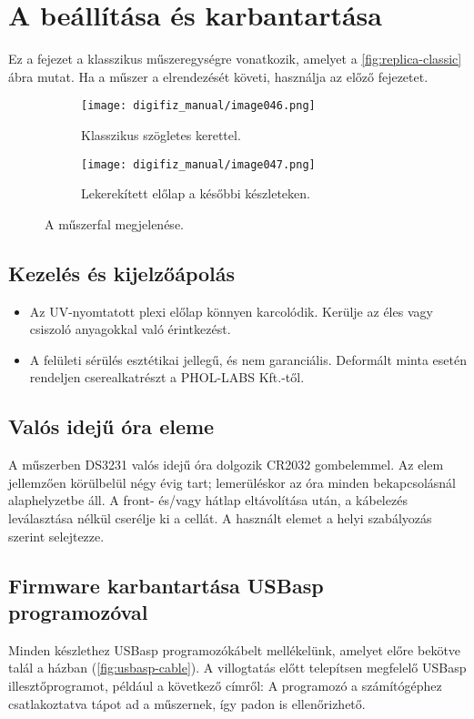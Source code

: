 \chapter{A \ReplicaGenOne{} beállítása és karbantartása}\label{ch:replica-setup}

Ez a fejezet a klasszikus \ReplicaGenOne{} műszeregységre vonatkozik, amelyet a \autoref{fig:replica-classic} ábra mutat. Ha a műszer a \ReplicaNextLong{} elrendezését követi, használja az előző fejezetet.

\begin{figure}[htbp]
    \centering
    \begin{subfigure}{0.46\textwidth}
        \texttt{[image: digifiz\_manual/image046.png]}
        \caption{Klasszikus \ReplicaGenOne{} szögletes kerettel.}
    \end{subfigure}\hfill
    \begin{subfigure}{0.46\textwidth}
        \texttt{[image: digifiz\_manual/image047.png]}
        \caption{Lekerekített előlap a későbbi készleteken.}
    \end{subfigure}
    \caption{A \ReplicaGenOne{} műszerfal megjelenése.}
    \label{fig:replica-classic}
\end{figure}

\section{Kezelés és kijelzőápolás}
\begin{itemize}
    \item Az UV-nyomtatott plexi előlap könnyen karcolódik. Kerülje az éles vagy csiszoló anyagokkal való érintkezést.
    \item A felületi sérülés esztétikai jellegű, és nem garanciális. Deformált minta esetén rendeljen cserealkatrészt a PHOL-LABS Kft.-től.
\end{itemize}

\section{Valós idejű óra eleme}
A műszerben DS3231 valós idejű óra dolgozik CR2032 gombelemmel. Az elem jellemzően körülbelül négy évig tart; lemerüléskor az óra minden bekapcsolásnál alaphelyzetbe áll. A front- és/vagy hátlap eltávolítása után, a kábelezés leválasztása nélkül cserélje ki a cellát. A használt elemet a helyi szabályozás szerint selejtezze.

\section{Firmware karbantartása USBasp programozóval}
Minden készlethez USBasp programozókábelt mellékelünk, amelyet előre bekötve talál a házban (\autoref{fig:usbasp-cable}). A villogtatás előtt telepítsen megfelelő USBasp illesztőprogramot, például a következő címről:
A programozó a számítógéphez csatlakoztatva tápot ad a műszernek, így padon is ellenőrizhető.

